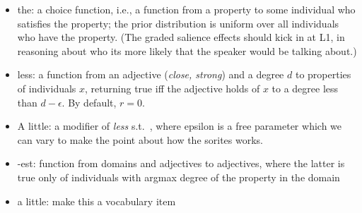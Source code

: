 \documentclass[pdfextras]{handbook}
\begin{document}
\begin{itemize}
\item the: a choice function, i.e., a function from a property to some individual who satisfies the property; the prior distribution is uniform over all individuals who have the property. (The graded salience effects should kick in at L1, in reasoning about who its more likely that the speaker would be talking about.)
\item less: a function from an adjective (\emph{close, strong}) and a degree $d$ to properties of individuals $x$, returning true iff the adjective holds of $x$ to a degree less than $d - \epsilon$. By default, $r = 0$. 
\item A little: a modifier of \emph{less} s.t.\ , where epsilon is a free parameter which we can vary to make the point about how the sorites works.
\item -est: function from domains and adjectives to adjectives, where the latter is true only of individuals with argmax degree of the property in the domain
\item a little: make this a vocabulary item  
\end{itemize} 
\end{document}

